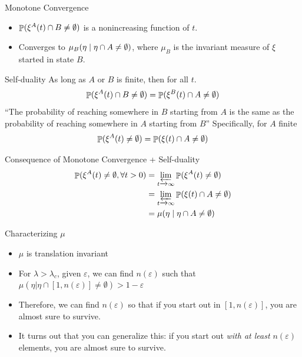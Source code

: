 \documentclass{beamer}
\newcommand{\ep}{\varepsilon}
\begin{document}
\begin{frame}{Monotone Convergence}
  \begin{itemize}
    \item $\mathop{\mathbb{P}}(\xi^{A}(t) \cap B \neq \emptyset)$ is a nonincreasing function of $t$.
      \pause
    \item Converges to $\mu_{B}(\eta \mid \eta \cap A \neq \emptyset)$, where $\mu_{B}$ is the invariant measure of $\xi$ started in state $B$.
  \end{itemize}
\end{frame}

\begin{frame}{Self-duality}
  As long as $A$ or $B$ is finite, then for all $t$.
  \begin{equation}
    \mathop{\mathbb{P}}(\xi^{A}(t) \cap B \neq \emptyset) = \mathop{\mathbb{P}}(\xi^{B}(t) \cap A \neq \emptyset)
  \end{equation}
  \pause
  ``The probability of reaching somewhere in $B$ starting from $A$ is the same as the probability of reaching somewhere in $A$ starting from $B$''
  \pause
  Specifically, for $A$ finite
  \begin{equation}
    \mathop{\mathbb{P}}(\xi^{A}(t) \neq \emptyset) = \mathop{\mathbb{P}}(\xi(t) \cap A \neq \emptyset)
  \end{equation}
\end{frame}

\begin{frame}{Consequence of Monotone Convergence + Self-duality}
  \begin{align*}
    \Prob(\xi^{A}(t) \neq \emptyset, \forall t > 0) &= \limas_{t \to \infty} \Prob(\xi^{A}(t) \neq \emptyset) \\
                                 &= \limas_{t \to \infty} \Prob(\xi(t) \cap A \neq \emptyset) \\
                                 &= \mu(\eta \st \eta \cap A \neq \emptyset)
  \end{align*}
\end{frame}

\begin{frame}{Characterizing $\mu$}
  \begin{itemize}
    \item $\mu$ is translation invariant
          \pause
    \item For $\lambda > \lambda_{c}$, given $\ep$, we can find $n(\ep)$ such that $\mu(\eta | \eta \cap [1,n(\ep)] \neq \emptyset) > 1 - \ep$
          \pause
    \item Therefore, we can find $n(\ep)$ so that if you start out in $[1,n(\ep)]$, you are almost sure to survive.
          \pause
    \item It turns out that you can generalize this: if you start out \emph{with at least $n(\ep)$} elements, you are almost sure to survive.
  \end{itemize}
\end{frame}
\end{document}
